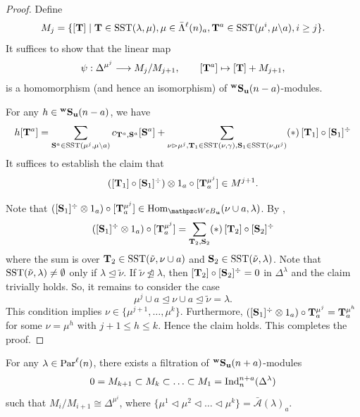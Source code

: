 \begin{proof}
    Define 
    \[M_j=\{[\mathbf{T}] \mid \mathbf{T} \in \text{SST}(\lambda,\mu), \mu\in \bar\Lambda^\ell(n)_a,  
    \mathbf{T}^a\in \text{SST}(\mu^i,\mu\backslash a), i\ge j  \} .\]
    It suffices to show that the linear map 
    \begin{align*}
        \psi : \Delta^{\mu^j} \longrightarrow M_j/M_{j+1}, \qquad
      [\mathbf{T}^a] \mapsto  [\mathbf{T}] + M_{j+1},
    \end{align*}
    is a homomorphism (and hence an isomorphism) of ${}^{\bold{w}}\bold{S}_{\mathbf{u}}(n-a)$-modules.

For any $h\in {}^{\bold{w}}\bold{S}_{\mathbf{u}}(n-a)$, we have 
\[ h [\mathbf{T}^a]=\sum_{\mathbf{S}^a\in \text{SST}(\mu^j,\mu\backslash a)} c_{\mathbf{T}^a,\mathbf{S}^a}
[\mathbf{S}^a] +\sum_{\nu\rhd \mu^j, \mathbf{T}_1\in \text{SST}(\nu,\gamma),\mathbf{S}_1\in \text{SST}(\nu,\mu^j)} (*) \,[\mathbf{T}_1]\circ [\mathbf{S}_1]^\div \]
It suffices to establish the claim that 
\[([\mathbf{T}_1]\circ [\mathbf{S}_1]^\div)\otimes 1_a \circ [\mathbf{T}_a^{\mu^j}]\in M^{j+1}.\]
 
  Note that $( [\bS_1]^\div\otimes 1_a) \circ [\bT_a^{\mu^j}]\in \Hom_{\qW_\bfu}(\nu\cup a, \lambda)$.
 By \cite[Proposition 5.11]{SSW25}, 
  \[ ( [\mathbf{S}_1]^\div\otimes 1_a) \circ [\mathbf{T}_a^{\mu^j}]= \sum_{\mathbf{T}_2,\mathbf{S}_2} (*)\,[\mathbf{T}_2]\circ [\mathbf{S}_2]^\div   \]
  where the sum is over $\mathbf{T}_2\in \text{SST}(\tilde \nu,\nu\cup a)$ and $\mathbf{S}_2\in \text{SST}(\tilde \nu,\lambda)$.
  Note that $ \text{SST}(\tilde \nu,\lambda)\neq \emptyset$ only if $ \lambda \unlhd \tilde\nu$. 
  If   $\tilde \nu \ntrianglelefteq \lambda$, then 
  $[\mathbf{T}_2]\circ [\mathbf{S}_2]^\div=0$ in $\Delta^\lambda$ and the claim trivially holds. 
  So, it remains to consider the case 
  \[ \mu^j\cup a \unlhd \nu\cup a \unlhd\tilde \nu = \lambda.\]
  This condition implies $\nu\in \{ \mu^{j+1},\ldots,\mu^k\}$.
  Furthermore, $ ([\mathbf{S}_1]^\div \otimes 1_a) \circ \mathbf{T}^{\mu^j}_a =\mathbf{T}^{\mu^h}_a$ for some $ \nu=\mu^h$ with $j+1\le h\le k$.
  Hence the claim holds. This completes the proof.
\end{proof}

\begin{proposition}
\label{prop:induction}
    For any $\lambda\in \text{Par}^\ell(n)$, there exists a filtration of ${}^{\bold{w}}\bold{S}_{\mathbf{u}}(n+a)$-modules 
    \[0=M_{k+1}\subset M_k\subset \ldots \subset M_1=\operatorname{Ind}\nolimits^{n+a}_{n} (\Delta^\lambda) \]
    such that $M_i/M_{i+1}\cong \Delta^{\mu^i}$, 
    where $\{\mu^1\lhd \mu^2\lhd\ldots\lhd\mu^k \}=\bar {\mathcal A}(\lambda)_a$. 
\end{proposition}

